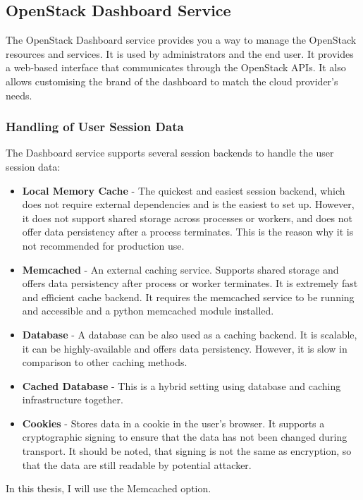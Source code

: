 \subsection{OpenStack Dashboard Service}
The OpenStack Dashboard service provides you a way to manage the OpenStack resources and services. It is used by administrators and the end user. It provides a web-based interface that communicates through the OpenStack APIs. It also allows customising the brand of the dashboard to match the cloud provider's needs. \cite{InstallGuide}

\subsubsection*{Handling of User Session Data}

The Dashboard service supports several session backends \cite{DeployingHorizon} to handle the user session data:
\begin{itemize}
  \item{\textbf{Local Memory Cache} - The quickest and easiest session backend, which does not require external dependencies and is the easiest to set up. However, it does not support shared storage across processes or workers, and does not offer data persistency after a process terminates. This is the reason why it is not recommended for production use.}
  \item{\textbf{Memcached} - An external caching service. Supports shared storage and offers data persistency after process or worker terminates. It is extremely fast and efficient cache backend. It requires the memcached service to be running and accessible and a python memcached module installed.}
  \item{\textbf{Database} - A database can be also used as a caching backend. It is scalable, it can be highly-available and offers data persistency. However, it is slow in comparison to other caching methods.}
  \item{\textbf{Cached Database} - This is a hybrid setting using database and caching infrastructure together.}
  \item{\textbf{Cookies} - Stores data in a cookie in the user's browser. It supports a cryptographic signing to ensure that the data has not been changed during transport. It should be noted, that signing is not the same as encryption, so that the data are still readable by potential attacker.}
\end{itemize}

In this thesis, I will use the Memcached option.
